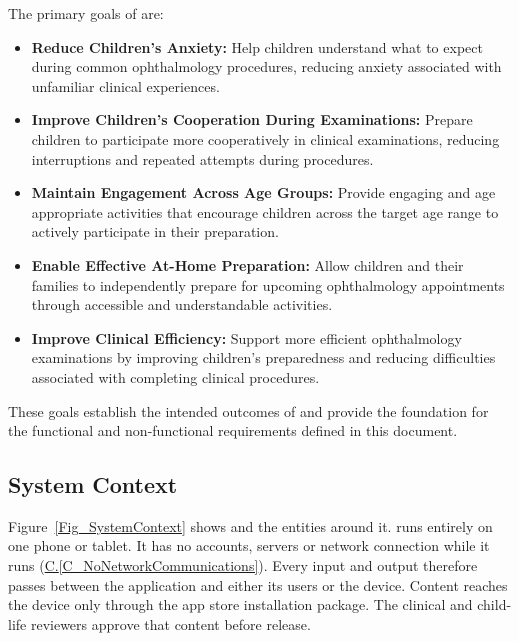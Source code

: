 \documentclass[12pt]{article}
\newcommand{\conref}[1]{\hyperref[#1]{C.\ref*{#1}}}
\begin{document}
The primary goals of \progname{} are:

\begin{itemize}
    \item \textbf{Reduce Children's Anxiety:}
    Help children understand what to expect during common ophthalmology
    procedures, reducing anxiety associated with unfamiliar clinical
    experiences.

    \item \textbf{Improve Children's Cooperation During Examinations:}
    Prepare children to participate more cooperatively in clinical
    examinations, reducing interruptions and repeated attempts
    during procedures.

    \item \textbf{Maintain Engagement Across Age Groups:}
    Provide engaging and age appropriate activities that encourage
    children across the target age range to actively participate
    in their preparation.

    \item \textbf{Enable Effective At-Home Preparation:}
    Allow children and their families to independently prepare
    for upcoming ophthalmology appointments through accessible
    and understandable activities.

    \item \textbf{Improve Clinical Efficiency:}
    Support more efficient ophthalmology examinations by improving
    children's preparedness and reducing difficulties associated
    with completing clinical procedures.
\end{itemize}

These goals establish the intended outcomes of \progname{} and provide
the foundation for the functional and non-functional requirements
defined in this document.
  
\subsection{System Context}
\label{sec_SystemContext}

Figure~\ref{Fig_SystemContext} shows \progname{} and the entities around it.
\progname{} runs entirely on one phone or tablet. It has no accounts, servers or
network connection while it runs (\conref{C_NoNetworkCommunications}). Every
input and output therefore passes between the application and either its users
or the device. Content reaches the device only through the app store
installation package. The clinical and child-life reviewers approve that
content before release.
\end{document}
